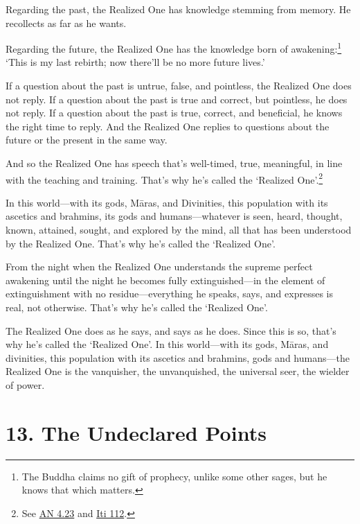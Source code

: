 \documentclass[12pt,openany]{book}%
\begin{document}
Regarding the past, the Realized One has knowledge stemming from memory. He recollects as far as he wants. 

Regarding the future, the Realized One has the knowledge born of awakening:\footnote{The Buddha claims no gift of prophecy, unlike some other sages, but he knows that which matters. } ‘This is my last rebirth; now there’ll be no more future lives.’ 

If a question about the past is untrue, false, and pointless, the Realized One does not reply. If a question about the past is true and correct, but pointless, he does not reply. If a question about the past is true, correct, and beneficial, he knows the right time to reply. And the Realized One replies to questions about the future or the present in the same way. 

And so the Realized One has speech that’s well-timed, true, meaningful, in line with the teaching and training. That’s why he’s called the ‘Realized One’.\footnote{See \href{https://suttacentral.net/an4.23/en/sujato}{AN 4.23} and \href{https://suttacentral.net/iti112/en/sujato}{Iti 112}. } 

In this world—with its gods, \textsanskrit{Māras}, and Divinities, this population with its ascetics and brahmins, its gods and humans—whatever is seen, heard, thought, known, attained, sought, and explored by the mind, all that has been understood by the Realized One. That’s why he’s called the ‘Realized One’. 

From the night when the Realized One understands the supreme perfect awakening until the night he becomes fully extinguished—in the element of extinguishment with no residue—everything he speaks, says, and expresses is real, not otherwise. That’s why he’s called the ‘Realized One’. 

The Realized One does as he says, and says as he does. Since this is so, that’s why he’s called the ‘Realized One’. In this world—with its gods, \textsanskrit{Māras}, and divinities, this population with its ascetics and brahmins, gods and humans—the Realized One is the vanquisher, the unvanquished, the universal seer, the wielder of power. 

\section*{13. The Undeclared Points }
\end{document}

